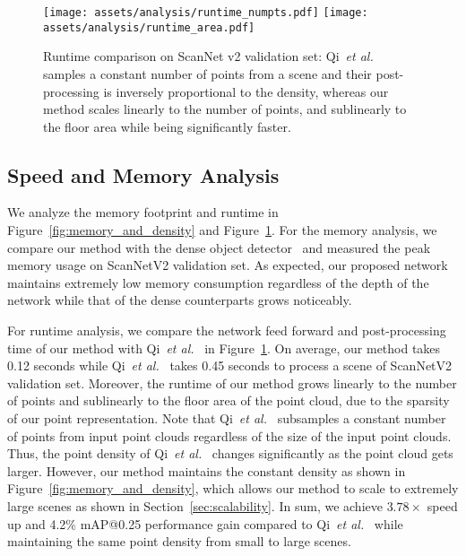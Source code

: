 \documentclass[runningheads]{llncs}
\newcommand{\etal}{\textit{et al.}}
\begin{document}
 \begin{figure}[t]
    \centering
    \texttt{[image: assets/analysis/runtime\_numpts.pdf]}
    \texttt{[image: assets/analysis/runtime\_area.pdf]}
    \vspace{-0.5em}
    \caption{Runtime comparison on ScanNet v2 validation set: Qi~\etal~\cite{qi2019deep} samples a constant number of points from a scene and their post-processing is inversely proportional to the density, whereas our method scales linearly to the number of points, and sublinearly to the floor area while being significantly faster.}
    \label{fig:scannet_runtime}
\end{figure} \subsection{Speed and Memory Analysis}
\label{sec:analysis}

We analyze the memory footprint and runtime in Figure~\ref{fig:memory_and_density} and Figure~\ref{fig:scannet_runtime}. For the memory analysis, we compare our method with the dense object detector~\cite{hou20193d} and measured the peak memory usage on ScanNetV2 validation set. As expected, our proposed network maintains extremely low memory consumption regardless of the depth of the network while that of the dense counterparts grows noticeably.


For runtime analysis, we compare the network feed forward and post-processing time of our method with Qi~\etal~\cite{qi2019deep} in Figure~\ref{fig:scannet_runtime}. On average, our method takes 0.12 seconds while Qi~\etal~\cite{qi2019deep} takes 0.45 seconds to process a scene of ScanNetV2 validation set. Moreover, the runtime of our method grows linearly to the number of points and sublinearly to the floor area of the point cloud, due to the sparsity of our point representation.
Note that Qi~\etal~\cite{qi2019deep} subsamples a constant number of points from input point clouds regardless of the size of the input point clouds.
Thus, the point density of Qi~\etal~\cite{qi2019deep} changes significantly as the point cloud gets larger.
However, our method maintains the constant density as shown in Figure~\ref{fig:memory_and_density}, which allows our method to scale to extremely large scenes as shown in Section~\ref{sec:scalability}.
In sum, we achieve $3.78\times$ speed up and 4.2\% mAP@0.25 performance gain compared to Qi~\etal~\cite{qi2019deep} while maintaining the same point density from small to large scenes.
 
\end{document}
